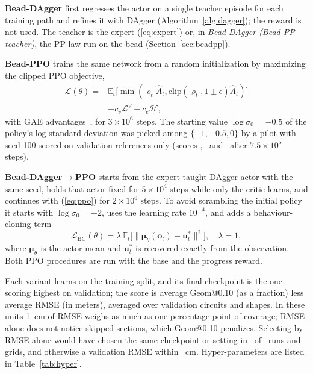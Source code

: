 \documentclass{IJCAS}
\begin{document}
\textbf{Bead-DAgger} first regresses the actor on a single teacher episode for each training path and refines it with DAgger (Algorithm~\ref{alg:dagger}); the reward is not used. The teacher is the expert (\ref{eq:expert}) or, in \emph{Bead-DAgger (Bead-PP teacher)}, the PP law run on the bead (Section~\ref{sec:beadpp}).

\textbf{Bead-PPO} trains the same network from a random initialization by maximizing the clipped PPO objective,
\begin{equation}
\begin{aligned}
\mathcal{L}(\theta)={}&\mathbb{E}_t\big[\min(\varrho_t\hat A_t,\mathrm{clip}(\varrho_t,1\pm\epsilon)\hat A_t)\big]\\
&-c_v\mathcal{L}^{V}+c_e\mathcal{H},
\end{aligned}\label{eq:ppo}
\end{equation}
with GAE advantages~\cite{schulman2016}, for $3\times10^6$ steps. The starting value $\log\sigma_0=-0.5$ of the policy's log standard deviation was picked among $\{-1,-0.5,0\}$ by a pilot with seed 100 scored on validation references only (scores \VpilotPmscore, \VpilotPhscore\ and \VpilotPzscore\ after $7.5\times10^5$ steps).

\textbf{Bead-DAgger$\to$PPO} starts from the expert-taught DAgger actor with the same seed, holds that actor fixed for $5\times10^4$ steps while only the critic learns, and continues with (\ref{eq:ppo}) for $2\times10^6$ steps. To avoid scrambling the initial policy it starts with $\log\sigma_0=-2$, uses the learning rate $10^{-4}$, and adds a behaviour-cloning term
\begin{equation}
\mathcal{L}_{\mathrm{BC}}(\theta)=\lambda\,\mathbb{E}_t\big[\|\boldsymbol{\mu}_\theta(\mathbf{o}_t)-\mathbf{u}^{*}_t\|^2\big],\quad\lambda=1,\label{eq:bc}
\end{equation}
where $\boldsymbol{\mu}_\theta$ is the actor mean and $\mathbf{u}^{*}_t$ is recovered exactly from the observation. Both PPO procedures are run with the base and the progress reward.

Each variant learns on the training split, and its final checkpoint is the one scoring highest on validation; the score is average Geom@0.10 (as a fraction) less average RMSE (in meters), averaged over validation circuits and shapes. In these units 1~cm of RMSE weighs as much as one percentage point of coverage; RMSE alone does not notice skipped sections, which Geom@0.10 penalizes. Selecting by RMSE alone would have chosen the same checkpoint or setting in \VselSame\ of \VselTotal\ runs and grids, and otherwise a validation RMSE within \VselMaxDiff~cm. Hyper-parameters are listed in Table~\ref{tab:hyper}.
\end{document}
